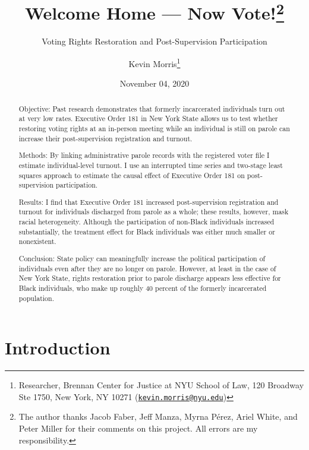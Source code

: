 \documentclass[
  12pt,
]{article}
\title{Welcome Home --- Now Vote!\thanks{The author thanks Jacob Faber, Jeff Manza, Myrna Pérez, Ariel White, and Peter Miller for their comments on this project. All errors are my responsibility.}}
\subtitle{Voting Rights Restoration and Post-Supervision Participation}
\author{Kevin Morris\footnote{Researcher, Brennan Center for Justice at NYU School of Law, 120 Broadway Ste 1750, New York, NY 10271 (\href{mailto:kevin.morris@nyu.edu}{\nolinkurl{kevin.morris@nyu.edu}})}}
\date{November 04, 2020}
\begin{document}
\maketitle
\begin{abstract}
Objective: Past research demonstrates that formerly incarcerated individuals turn out at very low rates. Executive Order 181 in New York State allows us to test whether restoring voting rights at an in-person meeting while an individual is still on parole can increase their post-supervision registration and turnout.

Methods: By linking administrative parole records with the registered voter file I estimate individual-level turnout. I use an interrupted time series and two-stage least squares approach to estimate the causal effect of Executive Order 181 on post-supervision participation.

Results: I find that Executive Order 181 increased post-supervision registration and turnout for individuals discharged from parole as a whole; these results, however, mask racial heterogeneity. Although the participation of non-Black individuals increased substantially, the treatment effect for Black individuals was either much smaller or nonexistent.

Conclusion: State policy can meaningfully increase the political participation of individuals even after they are no longer on parole. However, at least in the case of New York State, rights restoration prior to parole discharge appears less effective for Black individuals, who make up roughly 40 percent of the formerly incarcerated population.
\end{abstract}

\pagebreak
\doublespacing


\hypertarget{introduction}{%
\section*{Introduction}\label{introduction}}
\end{document}
